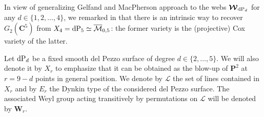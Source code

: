 \documentclass[11pt]{amsart}
\begin{document}
In view of generalizing Gelfand and MacPherson approach 
to the webs $\boldsymbol{\mathcal W}_{{\rm dP}_d}$ for any $d\in \{1,2,\ldots,4\}$, we remarked in \cite{PirioAFST} that there is an intrinsic way to recover $G_2(\mathbf C^5)$ from  $X_4={\rm dP}_5\simeq \overline{\mathcal M}_{0,5}$: the former variety is the (projective) Cox variety of the latter.  

Let ${\rm dP}_d$ be a fixed smooth del Pezzo surface  of degree $d\in \{2,\ldots,5\}$. We will also denote it by $X_r$ to emphasize that it can be obtained as the blow-up of $\mathbf P^2$ at $r=9-d$ points in general position.  
We denote by $\boldsymbol{\mathcal L}$ the set of lines contained in $X_r$
 and by $E_r$ the Dynkin type of the considered del Pezzo surface. The associated Weyl group acting transitively by permutations on $\boldsymbol{\mathcal L}$ will be denoted by $\boldsymbol{W}_r$. 
 
\end{document}
